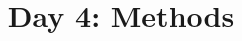 \documentclass{article}
\begin{document}
\title{Day 4: Methods}
\date{}
\maketitle


\end{document}
